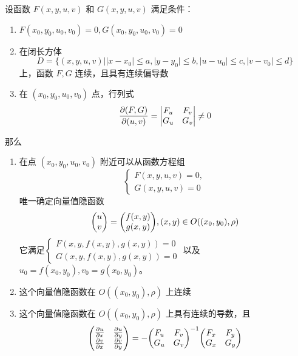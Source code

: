 \documentclass{ctexbook}
\begin{document}
\begin{theorem}[多元向量值隐函数存在定理]
    设函数 $F(x,y,u,v)$ 和 $G(x,y,u,v)$ 满足条件：
    \begin{enumerate}
        \item $F(x_0,y_0,u_0,v_0)=0,G(x_0,y_0,u_0,v_0)=0$
        \item 在闭长方体
        \begin{equation*}
            D=\{(x,y,u,v)||x-x_0|\leq a,|y-y_0|\leq b, |u-u_0|\leq c,|v-v_0|\leq d\}
        \end{equation*}
        上，函数 $F,G$ 连续，且具有连续偏导数
        \item 在 $(x_0,y_0,u_0,v_0)$ 点，行列式
        \begin{equation}
            \frac{\partial (F,G)}{\partial (u,v)}=\mqty|F_u & F_v \\G_u & G_v|\neq 0
        \end{equation}
    \end{enumerate}
    那么
    \begin{enumerate}
        \item 在点 $(x_0,y_0,u_0,v_0)$ 附近可以从函数方程组
        \begin{equation}
            \begin{cases}
                F(x,y,u,v)=0,\\
                G(x,y,u,v)=0
            \end{cases}
        \end{equation}
        唯一确定向量值隐函数
        \begin{equation}
            \mqty(u\\ v)=\mqty(f(x,y)\\ g(x,y)), (x,y)\in O((x_0,y_0),\rho)
        \end{equation}
        它满足$\begin{cases}
                F(x,y,f(x,y),g(x,y))=0\\
                G(x,y,f(x,y),g(x,y))=0
            \end{cases}$
        以及 $u_0=f(x_0,y_0),v_0=g(x_0,y_0)$。
        \item 这个向量值隐函数在 $O((x_0,y_0),\rho)$ 上连续
        \item 这个向量值隐函数在 $O((x_0,y_0),\rho)$ 上具有连续的导数，且
        \begin{equation}
            \mqty(\frac{\partial u}{\partial x} & \frac{\partial u}{\partial y}\\
            \frac{\partial v}{\partial x} & \frac{\partial v}{\partial y})=
            -\mqty(F_u & F_v\\ G_u & G_v)^{-1}\mqty(F_x & F_y\\ G_x & G_y)
        \end{equation}
    \end{enumerate}
\end{theorem}
\end{document}

